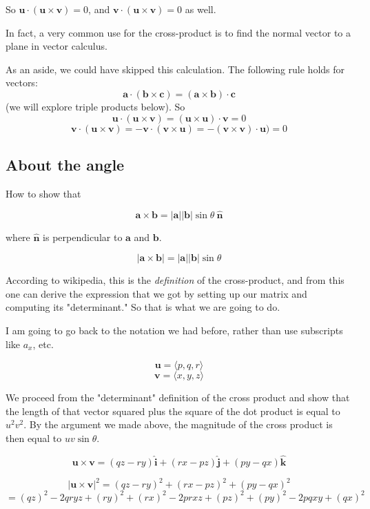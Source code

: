 \documentclass[11pt, oneside]{article}   	%
\begin{document}
So $\mathbf{u} \cdot (\mathbf{u} \times \mathbf{v}) = 0$, and $\mathbf{v} \cdot (\mathbf{u} \times \mathbf{v}) = 0$ as well.  

In fact, a very common use for the cross-product is to find the normal vector to a plane in vector calculus.

As an aside, we could have skipped this calculation.  The following rule holds for vectors:
\[ \mathbf{a} \cdot ( \mathbf{b} \times \mathbf{c} ) = ( \mathbf{a} \times \mathbf{b} ) \cdot \mathbf{c} \]
(we will explore triple products below).
So
\[ \mathbf{u} \cdot (\mathbf{u} \times \mathbf{v}) = (\mathbf{u} \times \mathbf{u}) \cdot \mathbf{v} = 0 \]
\[ \mathbf{v} \cdot (\mathbf{u} \times \mathbf{v}) = - \mathbf{v} \cdot (\mathbf{v} \times \mathbf{u}) = - (\mathbf{v} \times \mathbf{v}) \cdot \mathbf{u}) = 0 \]

\subsection*{About the angle}

How to show that

\[ \mathbf{a} \times \mathbf{b} = |\mathbf{a}| |\mathbf{b}| \sin \theta \ \hat{\mathbf{n}}  \]

where $\hat{\mathbf{n}}$ is perpendicular to $\mathbf{a}$ and $\mathbf{b}$.

\[ |\mathbf{a} \times \mathbf{b} | = |\mathbf{a}| |\mathbf{b}| \sin \theta \]

According to wikipedia, this is the \emph{definition} of the cross-product, and from this one can derive the expression that we got by setting up our matrix and computing its "determinant."  So that is what we are going to do.

I am going to go back to the notation we had before, rather than use subscripts like $a_x$, etc.

\[ \mathbf{u} = \langle p,q,r \rangle \]
\[ \mathbf{v} = \langle x,y,z \rangle \]

We proceed from the "determinant" definition of the cross product and show that the length of that vector squared plus the square of the dot product is equal to $u^2v^2$.  By the argument we made above, the magnitude of the cross product is then equal to $uv \sin \theta$.

\[ \mathbf{u} \times \mathbf{v}  = (qz-ry) \hat{\mathbf{i}}  + (rx-pz) \hat{\mathbf{j}} + (py-qx) \hat{\mathbf{k}}\]

\[ |\mathbf{u} \times \mathbf{v}|^2 = (qz-ry)^2 + (rx-pz)^2 + (py-qx)^2 \]
\[ = (qz)^2 - 2qryz + (ry)^2 + (rx)^2 - 2prxz + (pz)^2 + (py)^2 - 2pqxy + (qx)^2 \]
\end{document}
